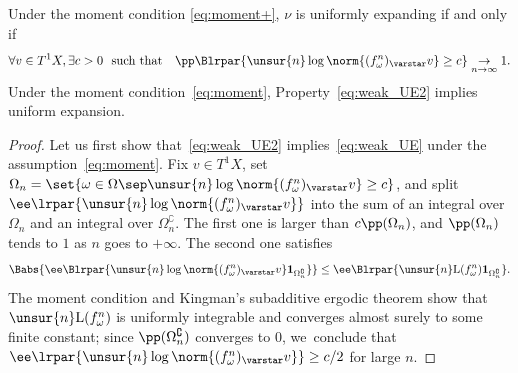 \begin{lem}\label{lem:weak_UE2}
Under the moment condition \eqref{eq:moment+}, $\nu$ is uniformly expanding if and only
if
\begin{equation}\label{eq:weak_UE2}
\forall v \in T^1X, \exists c>0 \ \text{ such that} \quad
\pp\Blrpar{ \unsur{n}\log \norm{ (f^n_\omega)_\varstar v} \geq c} \underset{n\to\infty}{\to} 1.
\end{equation}
Under the moment condition~\eqref{eq:moment}, Property~\eqref{eq:weak_UE2} implies uniform expansion.
\end{lem}

\begin{proof}
Let us first show that~\eqref{eq:weak_UE2} implies~\eqref{eq:weak_UE} under the assumption~\eqref{eq:moment}.
Fix $ v\in T^1X$,
set $\Omega_n = \set{ \omega\in \Omega \sep  \unsur{n}\log \norm{ (f^n_\omega)_\varstar v} \geq c}$, and split
$\ee\lrpar{\unsur{n}\log \norm{ (f^n_\omega)_\varstar v}}$ into the sum of an integral over $\Omega_n$ and an integral over $\Omega_n^\complement$. The first one is larger than $c \pp(\Omega_n)$, and $\pp(\Omega_n)$ tends to $1$ as $n$ goes to $+\infty$. The second one satisfies
\[
\Babs{\ee\Blrpar{\unsur{n}\log \norm{ (f^n_\omega)_\varstar v} \mathbf 1_{\Omega_n^\complement} } }\leq
\ee \Blrpar{ \unsur{n} \mathrm L (f^n_\omega) \mathbf 1_{\Omega_n^\complement} } .
\]
The moment condition and Kingman's subadditive ergodic theorem show that $ \unsur{n} \mathrm L(f^n_\omega)$ is uniformly integrable and converges almost surely to some finite constant; since $ \mathbf \pp({\Omega_n^\complement}) $ converges to $0$, we~conclude that $ \ee\lrpar{\unsur{n}\log \norm{ (f^n_\omega)_\varstar v}}\geq c/2$ for large $n$.


\end{proof}
